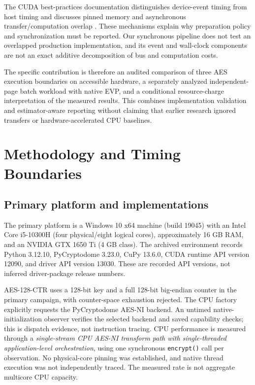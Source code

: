\documentclass[11pt,a4paper]{article}
\begin{document}
The CUDA best-practices documentation distinguishes device-event timing from host timing and discusses pinned memory and asynchronous transfer/computation overlap \citep{nvidia_guide}. These mechanisms explain why preparation policy and synchronization must be reported. Our synchronous pipeline does not test an overlapped production implementation, and its event and wall-clock components are not an exact additive decomposition of bus and computation costs.

The specific contribution is therefore an audited comparison of three AES execution boundaries on accessible hardware, a separately analyzed independent-page batch workload with native EVP, and a conditional resource-charge interpretation of the measured results. This combines implementation validation and estimator-aware reporting without claiming that earlier research ignored transfers or hardware-accelerated CPU baselines.

\section{Methodology and Timing Boundaries}
\subsection{Primary platform and implementations}
The primary platform is a Windows 10 x64 machine (build 19045) with an Intel Core i5-10300H (four physical/eight logical cores), approximately 16 GB RAM, and an NVIDIA GTX 1650 Ti (4 GB class). The archived environment records Python 3.12.10, PyCryptodome 3.23.0, CuPy 13.6.0, CUDA runtime API version 12090, and driver API version 13030. These are recorded API versions, not inferred driver-package release numbers.

AES-128-CTR uses a 128-bit key and a full 128-bit big-endian counter in the primary campaign, with counter-space exhaustion rejected. The CPU factory explicitly requests the PyCryptodome AES-NI backend. An untimed native-initialization observer verifies the selected backend and saved capability checks; this is dispatch evidence, not instruction tracing. CPU performance is measured through a \emph{single-stream CPU AES-NI transform path with single-threaded application-level orchestration}, using one synchronous \texttt{encrypt()} call per observation. No physical-core pinning was established, and native thread execution was not independently traced. The measured rate is not aggregate multicore CPU capacity.
\end{document}
